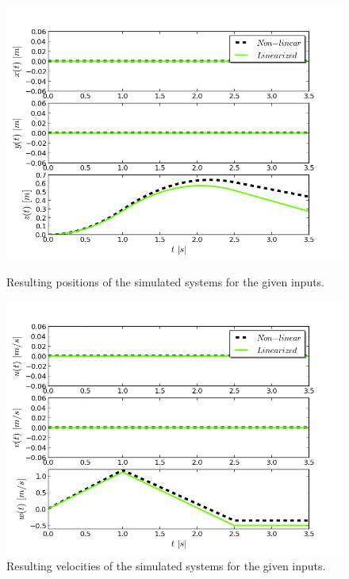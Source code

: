 \begin{figure}[h!]
\centering
\includegraphics[scale=0.7]{Images/Chapter3/Constant_thrust_upwards/Positions.png}
\caption{Resulting positions of the simulated systems for the given inputs.}
\label{fig:upwards_positions}

\includegraphics[scale=0.7]{Images/Chapter3/Constant_thrust_upwards/Linear_velocities.png}
\caption{Resulting velocities of the simulated systems for the given inputs.}
\label{fig:upwards_velocities}
\end{figure}

